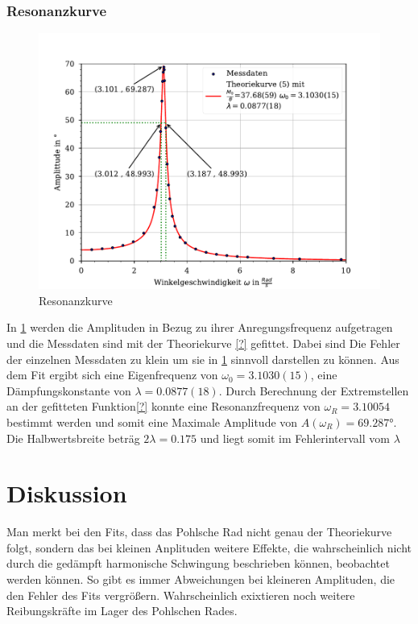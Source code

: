 \documentclass[11pt, a4paper]{article}
\begin{document}
	\subsubsection{Resonanzkurve}
	\begin{figure}
        \centering
        \includegraphics[width=\textwidth]{./10Plot.pdf}

        \caption{Resonanzkurve}
        \label{fig:Resonanzkurve}
    \end{figure}
    In \ref{fig:Resonanzkurve} werden die Amplituden in Bezug zu ihrer Anregungsfrequenz aufgetragen und die Messdaten sind
    mit der Theoriekurve \ref{?} gefittet. Dabei sind Die Fehler der einzelnen Messdaten zu klein um sie in \ref{fig:Resonanzkurve} sinnvoll darstellen zu können. Aus dem Fit ergibt sich eine Eigenfrequenz von $\omega_0=3.1030(15)$, eine Dämpfungskonstante von $\lambda=0.0877(18)$. Durch Berechnung der Extremstellen an der gefitteten Funktion\ref{?} konnte eine Resonanzfrequenz von $\omega_R=3.10054$ bestimmt werden und somit eine Maximale Amplitude von $A(\omega_R)=69.287°$. Die Halbwertsbreite beträg $2\lambda=0.175$ und liegt somit im Fehlerintervall vom $\lambda$ 
	
    \section{Diskussion}

    Man merkt bei den Fits, dass das Pohlsche Rad nicht genau der Theoriekurve folgt, sondern das bei kleinen Anplituden
    weitere Effekte, die wahrscheinlich nicht durch die gedämpft harmonische Schwingung beschrieben können, beobachtet werden können.
    So gibt es immer Abweichungen bei kleineren Amplituden, die den Fehler des Fits vergrößern. Wahrscheinlich exixtieren noch weitere
    Reibungskräfte im Lager des Pohlschen Rades. \\
\end{document}
